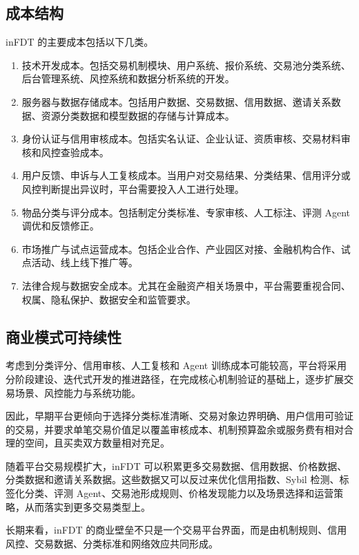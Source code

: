 \documentclass[UTF8,a4paper,12pt]{ctexart}
\begin{document}
\subsection{成本结构}

inFDT 的主要成本包括以下几类。

\begin{enumerate}
    \item 技术开发成本。包括交易机制模块、用户系统、报价系统、交易池分类系统、后台管理系统、风控系统和数据分析系统的开发。
    \item 服务器与数据存储成本。包括用户数据、交易数据、信用数据、邀请关系数据、资源分类数据和模型数据的存储与计算成本。
    \item 身份认证与信用审核成本。包括实名认证、企业认证、资质审核、交易材料审核和风控查验成本。
    \item 用户反馈、申诉与人工复核成本。当用户对交易结果、分类结果、信用评分或风控判断提出异议时，平台需要投入人工进行处理。
    \item 物品分类与评分成本。包括制定分类标准、专家审核、人工标注、评测 Agent 调优和反馈修正。
    \item 市场推广与试点运营成本。包括企业合作、产业园区对接、金融机构合作、试点活动、线上线下推广等。
    \item 法律合规与数据安全成本。尤其在金融资产相关场景中，平台需要重视合同、权属、隐私保护、数据安全和监管要求。
\end{enumerate}


\subsection{商业模式可持续性}

考虑到分类评分、信用审核、人工复核和 Agent 训练成本可能较高，平台将采用分阶段建设、迭代式开发的推进路径，在完成核心机制验证的基础上，逐步扩展交易场景、风控能力与系统功能。

因此，早期平台更倾向于选择分类标准清晰、交易对象边界明确、用户信用可验证的交易，并要求单笔交易价值足以覆盖审核成本、机制预算盈余或服务费有相对合理的空间，且买卖双方数量相对充足。

随着平台交易规模扩大，inFDT 可以积累更多交易数据、信用数据、价格数据、分类数据和邀请关系数据。这些数据又可以反过来优化信用指数、Sybil 检测、标签化分类、评测 Agent、交易池形成规则、价格发现能力以及场景选择和运营策略，从而落实到更多交易类型上。

长期来看，inFDT 的商业壁垒不只是一个交易平台界面，而是由机制规则、信用风控、交易数据、分类标准和网络效应共同形成。
\end{document}
